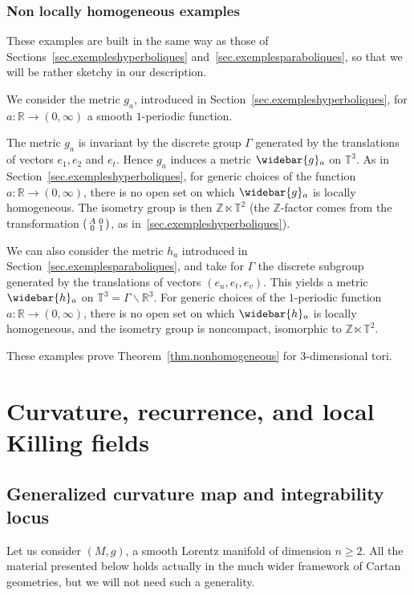 \documentclass[11pt]{article}
\theoremstyle{definition}
\numberwithin{equation}{section}
\numberwithin{figure}{section}
\numberwithin{table}{section}
\newcommand*\TT{\mathbb{T}}
\newcommand*\RR{\mathbb{R}}
\newcommand*\ZZ{\mathbb{Z}}
\let\oldbar\bar
\renewcommand*{\bar}[1]{\mathchoice{\widebar{#1}}{\widebar{#1}}{\oldbar{#1}}{\oldbar{#1}}}
\renewcommand*{\overline}{\bar}
\newenvironment{smallpmatrix}{\left(\begin{smallmatrix}}{\end{smallmatrix}\right)}
\begin{document}
\subsubsection{Non locally homogeneous examples}\label{sec.exemplestorus2}

These examples are built in the same way as those of Sections~\ref{sec.exempleshyperboliques} and~\ref{sec.exemplesparaboliques}, so that we will be rather sketchy in our description.

We consider the metric $g_a$, introduced in Section~\ref{sec.exempleshyperboliques}, for $a: \RR \to (0,\infty)$ a smooth $1$-periodic function.

The metric $g_a$ is invariant by the discrete group $\Gamma$ generated by the translations of vectors $e_1,e_2$ and $e_t$. Hence $g_a$ induces a metric $\overline{g}_a$ on $\TT^3$. As in Section~\ref{sec.exempleshyperboliques}, for generic choices of the function $a:\RR \to (0,\infty)$, there is no open set on which $\overline{g}_a$ is locally homogeneous. The isometry group is then $\ZZ \ltimes \TT^2$ (the $\ZZ$-factor comes from the transformation $
\begin{smallpmatrix} A & 0\\ 0 & 1
\end{smallpmatrix}$, as in~\ref{sec.exempleshyperboliques}).


We can also consider the metric $h_a$ introduced in Section~\ref{sec.exemplesparaboliques}, and take for $\Gamma$ the discrete subgroup generated by the translations of vectors $(e_u,e_t,e_v)$. This yields a metric $\overline{h}_a$ on $\TT^3=\Gamma \backslash \RR^3$. For generic choices of the $1$-periodic function $a:\RR \to (0,\infty)$, there is no open set on which $\overline{h}_a$ is locally homogeneous, and the isometry group is noncompact, isomorphic to $\ZZ \ltimes \TT^2$.

These examples prove Theorem~\ref{thm.nonhomogeneous} for $3$-dimensional tori.


\section{Curvature, recurrence, and local Killing fields}\label{sec.gromov}
\subsection{Generalized curvature map and integrability locus}\label{sec.curvaturemap}

Let us consider $(M,g)$, a smooth Lorentz manifold of dimension $n \geq 2$. All the material presented below holds actually in the much wider framework of Cartan geometries, but we will not need such a generality.
\end{document}
